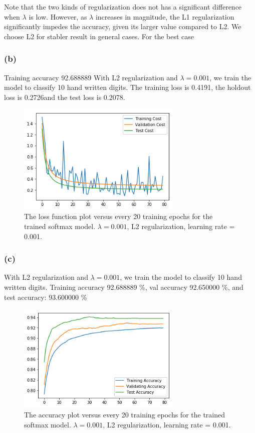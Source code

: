 \documentclass{article}
\begin{document}
Note that the two kinds of regularization does not has a significant difference when $\lambda$ is low. However, as $\lambda$ increases in magnitude, the L1 regularization significantly impedes the accuracy, given its larger value compared to L2. We choose L2 for stabler result in general cases.
For the best case

\subsubsection{(b)}
Training accuracy 92.688889 %
With L2 regularization and $\lambda=0.001$, we train the model to classify 10 hand written digits. The training loss is 0.4191, the holdout loss is 0.2726and the test loss is 0.2078.
\begin{figure}[h]
	\centering
	\includegraphics[width=0.7\textwidth]{pics/softmax_best_loss.png}
	\caption{The loss function plot versus every 20 training epochs for the trained softmax model. $\lambda =0.001$, L2 regularization, learning rate = 0.001. }
\end{figure}

\subsubsection{(c)}
With L2 regularization and $\lambda=0.001$, we train the model to classify 10 hand written digits. Training accuracy 92.688889 \%, val accuracy 92.650000 \%, and test accuracy: 93.600000 \%
\begin{figure}[h]
	\centering
	\includegraphics[width=0.7\textwidth]{pics/softmax_best_accuracy.png}
	\caption{The accuracy plot versus every 20 training epochs for the trained softmax model. $\lambda =0.001$, L2 regularization, learning rate = 0.001. }
\end{figure}
\end{document}
